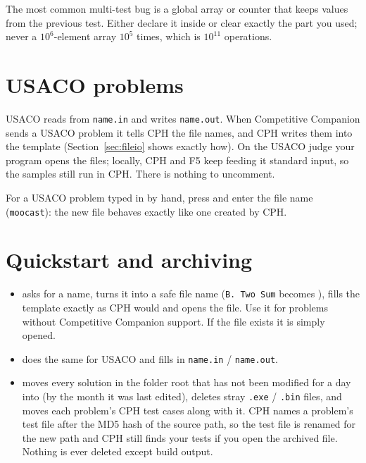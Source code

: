 \begin{pitfall}
The most common multi-test bug is a global array or counter that keeps values from the previous test.
Either declare it inside  or clear exactly the part you used; never  a $10^6$-element
array $10^5$ times, which is $10^{11}$ operations.
\end{pitfall}

\section{USACO problems}\label{sec:usaco}

USACO reads from \texttt{name.in} and writes \texttt{name.out}. When Competitive Companion sends a USACO problem it
tells CPH the file names, and CPH writes them into the template (Section~\ref{sec:fileio} shows exactly how).
On the USACO judge your program opens the files; locally, CPH and F5 keep feeding it standard input, so the
samples still run in CPH. There is nothing to uncomment.

For a USACO problem typed in by hand, press  and enter the file name (\texttt{moocast}): the new file
behaves exactly like one created by CPH.

\section{Quickstart and archiving}\label{sec:quickstart}

\begin{itemize}
  \item {} asks for a name, turns it into a safe file name (\texttt{B. Two Sum} becomes
        ), fills the template exactly as CPH would and opens the file. Use it for problems
        without Competitive Companion support. If the file exists it is simply opened.
  \item {} does the same for USACO and fills in \texttt{name.in} / \texttt{name.out}.
  \item {} moves every solution in the folder root that has not been modified for a day into
         (by the month it was last edited), deletes stray \texttt{.exe} / \texttt{.bin} files,
        and moves each problem's CPH test cases along with it. CPH names a problem's test file after the MD5 hash of
        the source path, so the test file is renamed for the new path and CPH still finds your tests if you open the
        archived file. Nothing is ever deleted except build output.
\end{itemize}
